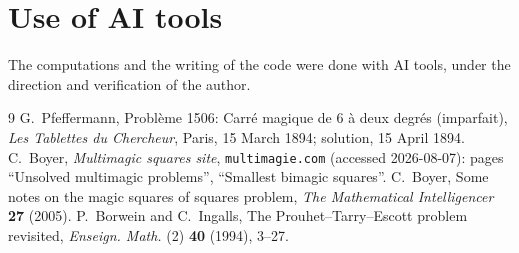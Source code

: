 \documentclass[11pt]{article}
\begin{document}
\section*{Use of AI tools}

The computations and the writing of the code were done with AI tools,
under the direction and verification of the author.

\begin{thebibliography}{9}
 G.~Pfeffermann, Probl\`eme 1506: Carr\'e
magique de 6 \`a deux degr\'es (imparfait), \emph{Les Tablettes du
Chercheur}, Paris, 15 March 1894; solution, 15 April 1894.
 C.~Boyer, \emph{Multimagic squares site},
\texttt{multimagie.com} (accessed 2026-08-07): pages ``Unsolved
multimagic problems'', ``Smallest bimagic squares''.
 C.~Boyer, Some notes on the magic squares of squares
problem, \emph{The Mathematical Intelligencer} \textbf{27} (2005).
 P.~Borwein and C.~Ingalls, The Prouhet--Tarry--Escott
problem revisited, \emph{Enseign. Math.} (2) \textbf{40} (1994),
3--27.
\end{thebibliography}
\end{document}
